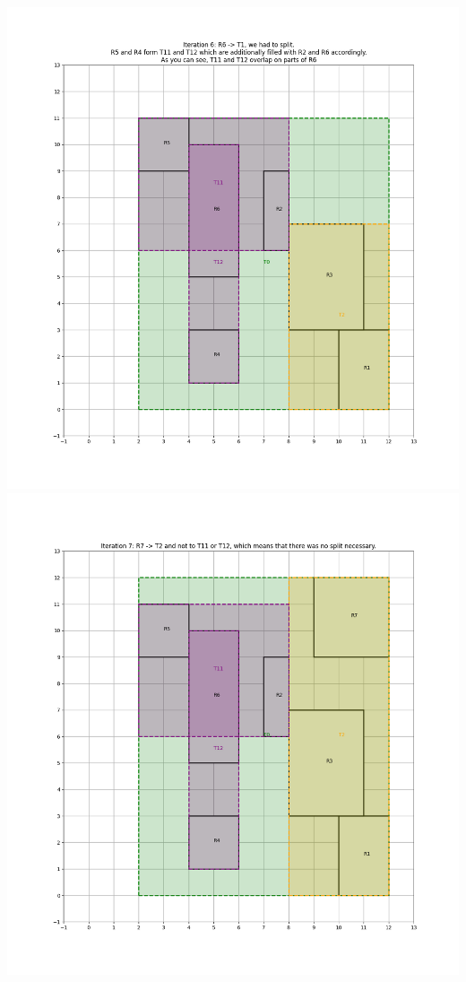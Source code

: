 \begin{center}
        \includegraphics[scale=0.5]{./A1 figs/iter6.png}
        \includegraphics[scale=0.5]{./A1 figs/iter7.png}
    \end{center}

